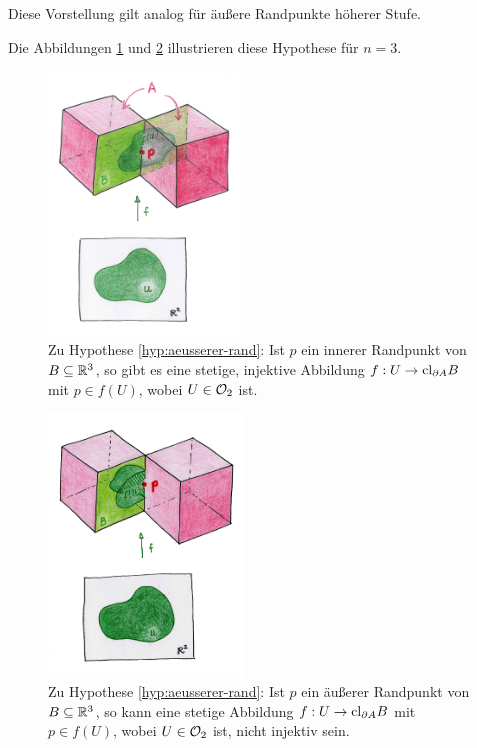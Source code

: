     Diese Vorstellung gilt analog für äußere Randpunkte höherer Stufe.
    
    Die Abbildungen \ref{fig:pflasterbild-innerer-rp} und \ref{fig:pflasterbild-aeusserer-rp} illustrieren diese Hypothese für $n=3$.
    
    
    \begin{figure}[ht]
        \centering
        \includegraphics[height=7cm]{bearbeitet-22-04-25/pflasterbild-innerer-rp.png}
        \caption[Zu Hypothese \ref{hyp:aeusserer-rand} (innerer Randpunkt)]{Zu Hypothese \ref{hyp:aeusserer-rand}: Ist $p$ ein innerer Randpunkt von $B \subseteq \mathbb{R}^3$, so gibt es eine stetige, injektive Abbildung $f:U \to \text{cl}_{\partial A} B$ mit $p \in f(U)$, wobei $U \in \mathcal{O}_2$ ist.}
        \label{fig:pflasterbild-innerer-rp}
    \end{figure}
    
    \begin{figure}[ht]
        \centering
        \includegraphics[height=7cm]{bearbeitet-22-04-25/pflasterbild-aeusserer-rp.png}
        \caption[Zu Hypothese \ref{hyp:aeusserer-rand} (äußerer Randpunkt)]{Zu Hypothese \ref{hyp:aeusserer-rand}: Ist $p$ ein äußerer Randpunkt von $B \subseteq \mathbb{R}^3$, so kann eine stetige Abbildung $f:U \to \text{cl}_{\partial A} B$ mit $p \in f(U)$, wobei $U \in \mathcal{O}_2$ ist, nicht injektiv sein.}
        \label{fig:pflasterbild-aeusserer-rp}
    \end{figure}
    
